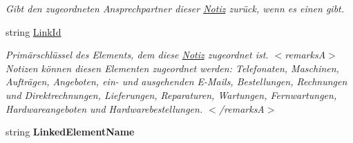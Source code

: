 \begin{DoxyCompactItemize}
\begin{DoxyCompactList}\small\item\em Gibt den zugeordneten Ansprechpartner dieser \hyperlink{class_products_1_1_model_1_1_entities_1_1_notiz}{Notiz} zurück, wenn es einen gibt. \end{DoxyCompactList}\item 
string \hyperlink{class_products_1_1_model_1_1_entities_1_1_notiz_aeb7c1d598ed2869ffd90f8878935ade8}{Link\+Id}
\begin{DoxyCompactList}\small\item\em Primärschlüssel des Elements, dem diese \hyperlink{class_products_1_1_model_1_1_entities_1_1_notiz}{Notiz} zugeordnet ist. $<$remarks\+A$>$ Notizen können diesen Elementen zugeordnet werden\+: Telefonaten, Maschinen, Aufträgen, Angeboten, ein-\/ und ausgehenden E-\/\+Mails, Bestellungen, Rechnungen und Direktrechnungen, Lieferungen, Reparaturen, Wartungen, Fernwartungen, Hardwareangeboten und Hardwarebestellungen. $<$/remarks\+A$>$ \end{DoxyCompactList}\item 
string {\bfseries Linked\+Element\+Name}\hypertarget{class_products_1_1_model_1_1_entities_1_1_notiz_a3dbedc09ba45aacbdffadcbb7862924e}{}\label{class_products_1_1_model_1_1_entities_1_1_notiz_a3dbedc09ba45aacbdffadcbb7862924e}


\end{DoxyCompactItemize}
